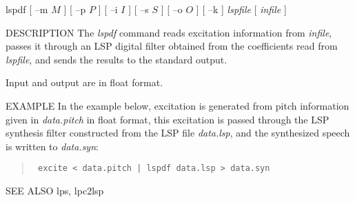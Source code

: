 
\begin{synopsis}
\item [lspdf] [ --m $M$ ] [ --p $P$ ] [ --i $I$ ] [ --s $S$ ] [ --o $O$ ] 
              [ --k ] {\em lspfile} [ {\em infile} ] 
\end{synopsis}

\begin{qsection}{DESCRIPTION}
The {\em lspdf} command reads excitation information from
{\em infile},  passes it through an LSP digital filter
obtained from the coefficients read from {\em lspfile},
and sends the results to the standard output.
\par
Input and output are in float format.
\end{qsection}

\begin{options}
\end{options}

\begin{qsection}{EXAMPLE}
In the example below, excitation is generated from
pitch information given in {\em data.pitch} in float format,
this excitation is passed through the LSP synthesis filter
constructed from the LSP file {\em data.lsp},
and the synthesized speech is written to {\em data.syn}:
\begin{quote}
\verb! excite < data.pitch | lspdf data.lsp > data.syn!
\end{quote}
\end{qsection}

\begin{qsection}{SEE ALSO}
 lps, lpc2lsp
\end{qsection}
